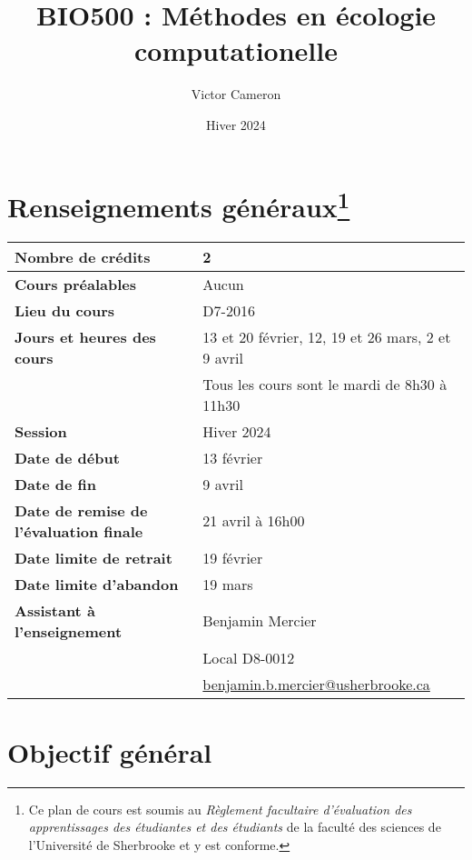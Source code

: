 \documentclass[12]{article}
\title{BIO500 : Méthodes en écologie computationelle}
\date {Hiver 2024}
\author {Victor Cameron}
\affil {Département de biologie \\
Université de Sherbrooke \\ 
Local D8-0012 \\ 
819-821-8000 \#61928}
\affil {\url{victor.cameron@usherbrooke.ca}}
\begin{document}
	\maketitle

	\section*{Renseignements généraux\footnote{Ce plan de cours est soumis au \textit{Règlement facultaire d'évaluation des apprentissages des étudiantes et des étudiants} de la faculté des sciences de l'Université de Sherbrooke et y est conforme.}} 
        
        \begin{center}
			\begin{tabular}{ m{22em} m{24em} }
				\hline
				\hline
				\textbf{Nombre de crédits} & 2 \\ 
				\hline
				\textbf{Cours préalables} & Aucun \\
				\hline
				\textbf{Lieu du cours} & D7-2016 \\
				\hline
				\textbf{Jours et heures des cours} & 13 et 20 février, 12, 19 et 26 mars, 2 et 9 avril \\ & Tous les cours sont le mardi de 8h30 à 11h30 \\
				\hline
				\textbf{Session} & Hiver 2024 \\
				\hline
				\textbf{Date de début} & 13 février \\
				\hline
				\textbf{Date de fin} & 9 avril \\
				\hline
				\textbf{Date de remise de l'évaluation finale} & 21 avril à 16h00 \\
				\hline
				\textbf{Date limite de retrait} & 19 février \\
				\hline
				\textbf{Date limite d'abandon} & 19 mars \\
				\hline
				\textbf{Assistant à l'enseignement} & Benjamin Mercier \\ & Local D8-0012 \\ & \url{benjamin.b.mercier@usherbrooke.ca} \\
				\hline
				\hline
			\end{tabular}
        \end{center}

	\section*{Objectif général}
\end{document}
